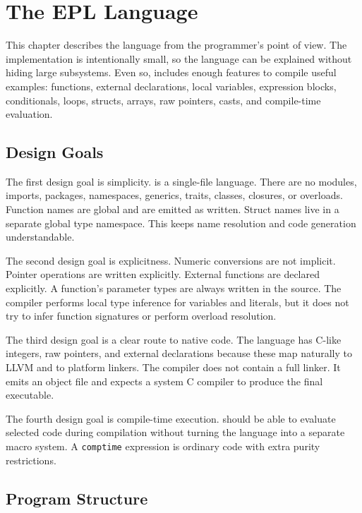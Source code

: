 \chapter{The EPL Language}
\label{chap:language}

This chapter describes the \epl{} language from the programmer's point of view.
The implementation is intentionally small, so the language can be explained
without hiding large subsystems. Even so, \epl{} includes enough features to
compile useful examples: functions, external declarations, local variables,
expression blocks, conditionals, loops, structs, arrays, raw pointers, casts, and
compile-time evaluation.

\section{Design Goals}

The first design goal is simplicity. \epl{} is a single-file language. There are
no modules, imports, packages, namespaces, generics, traits, classes, closures,
or overloads. Function names are global and are emitted as written. Struct names
live in a separate global type namespace. This keeps name resolution and code
generation understandable.

The second design goal is explicitness. Numeric conversions are not implicit.
Pointer operations are written explicitly. External functions are declared
explicitly. A function's parameter types are always written in the source. The
compiler performs local type inference for variables and literals, but it does
not try to infer function signatures or perform overload resolution.

The third design goal is a clear route to native code. The language has C-like
integers, raw pointers, and external declarations because these map naturally to
LLVM and to platform linkers. The compiler does not contain a full linker. It
emits an object file and expects a system C compiler to produce the final
executable.

The fourth design goal is compile-time execution. \epl{} should be able to
evaluate selected code during compilation without turning the language into a
separate macro system. A \texttt{comptime} expression is ordinary \epl{} code
with extra purity restrictions.

\section{Program Structure}

